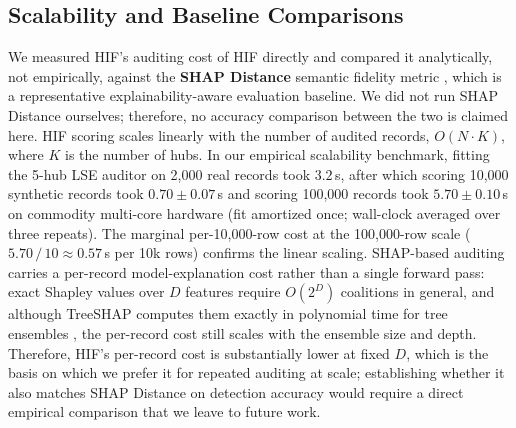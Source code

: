 \documentclass[pdflatex,sn-mathphys-num]{sn-jnl}
\theoremstyle{thmstyleone}%
\theoremstyle{thmstyletwo}%
\theoremstyle{thmstylethree}%
\begin{document}
\begin{appendices}
\subsection{Scalability and Baseline Comparisons}\label{app:scalability}
We measured HIF's auditing cost of HIF directly and compared it analytically, not empirically, against the \textbf{SHAP Distance} semantic fidelity metric \cite{yu2025shap}, which is a representative explainability-aware evaluation baseline. We did not run SHAP Distance ourselves; therefore, no accuracy comparison between the two is claimed here. HIF scoring scales linearly with the number of audited records, $O(N \cdot K)$, where $K$ is the number of hubs. In our empirical scalability benchmark, fitting the 5-hub LSE auditor on 2,000 real records took $3.2$\,s, after which scoring 10,000 synthetic records took $0.70 \pm 0.07$\,s and scoring 100,000 records took $5.70 \pm 0.10$\,s on commodity multi-core hardware (fit amortized once; wall-clock averaged over three repeats). The marginal per-10,000-row cost at the 100,000-row scale ($5.70\,/\,10 \approx 0.57$\,s per 10k rows) confirms the linear scaling. SHAP-based auditing carries a per-record model-explanation cost rather than a single forward pass: exact Shapley values over $D$ features require $O(2^D)$ coalitions in general, and although TreeSHAP computes them exactly in polynomial time for tree ensembles \cite{lundberg2020local}, the per-record cost still scales with the ensemble size and depth. Therefore, HIF’s per-record cost is substantially lower at fixed $D$, which is the basis on which we prefer it for repeated auditing at scale; establishing whether it also matches SHAP Distance on detection accuracy would require a direct empirical comparison that we leave to future work.

\end{appendices}
\end{document}
